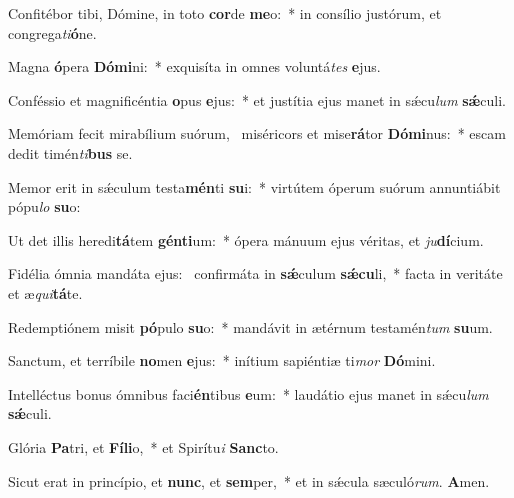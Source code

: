 \item Confitébor tibi, Dómine, in toto \textbf{cor}de \textbf{me}o:~* in consílio justórum, et congrega\textit{ti}\textbf{ó}ne.

\item Magna \textbf{ó}pera \textbf{Dó}\textbf{mi}ni:~* exquisíta in omnes voluntá\textit{tes} \textbf{e}jus.

\item Conféssio et magnificéntia \textbf{o}pus \textbf{e}jus:~* et justítia ejus manet in sǽcu\textit{lum} \textbf{sǽ}culi.

\item Memóriam fecit mirabílium suórum,~\pscross{} miséricors et mise\textbf{rá}tor \textbf{Dó}\textbf{mi}nus:~* escam dedit timén\textit{ti}\textbf{bus} se.

\item Memor erit in sǽculum testa\textbf{mén}ti \textbf{su}i:~* virtútem óperum suórum annuntiábit pópu\textit{lo} \textbf{su}o:

\item Ut det illis heredi\textbf{tá}tem \textbf{gén}\textbf{ti}um:~* ópera mánuum ejus véritas, et \textit{ju}\textbf{dí}cium.

\item Fidélia ómnia mandáta ejus:~\pscross{} confirmáta in \textbf{sǽ}culum \textbf{sǽ}\textbf{cu}li,~* facta in veritáte et æ\textit{qui}\textbf{tá}te.

\item Redemptiónem misit \textbf{pó}pulo \textbf{su}o:~* mandávit in ætérnum testamén\textit{tum} \textbf{su}um.

\item Sanctum, et terríbile \textbf{no}men \textbf{e}jus:~* inítium sapiéntiæ ti\textit{mor} \textbf{Dó}mini.

\item Intelléctus bonus ómnibus faci\textbf{én}tibus \textbf{e}um:~* laudátio ejus manet in sǽcu\textit{lum} \textbf{sǽ}culi.

\item Glória \textbf{Pa}tri, et \textbf{Fí}\textbf{li}o,~* et Spirítu\textit{i} \textbf{Sanc}to.

\item Sicut erat in princípio, et \textbf{nunc}, et \textbf{sem}per,~* et in sǽcula sæculó\textit{rum}. \textbf{A}men.